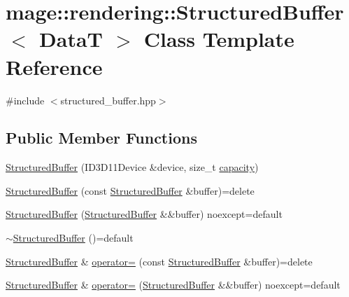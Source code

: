 \hypertarget{classmage_1_1rendering_1_1_structured_buffer}{}\section{mage\+:\+:rendering\+:\+:Structured\+Buffer$<$ DataT $>$ Class Template Reference}
\label{classmage_1_1rendering_1_1_structured_buffer}


{\ttfamily \#include $<$structured\+\_\+buffer.\+hpp$>$}

\subsection*{Public Member Functions}
\begin{DoxyCompactItemize}
\item 
\hyperlink{classmage_1_1rendering_1_1_structured_buffer_a7a12044b41fccd5c3a9c6d600ae8fd14}{Structured\+Buffer} (I\+D3\+D11\+Device \&device, size\+\_\+t \hyperlink{classmage_1_1rendering_1_1_structured_buffer_acbcdaebd04869e0248b8394c4823c433}{capacity})
\item 
\hyperlink{classmage_1_1rendering_1_1_structured_buffer_a447ca1bad6b4dc97bd993ce6e621f16a}{Structured\+Buffer} (const \hyperlink{classmage_1_1rendering_1_1_structured_buffer}{Structured\+Buffer} \&buffer)=delete
\item 
\hyperlink{classmage_1_1rendering_1_1_structured_buffer_ac6e1af93013761263b4ca418609b0518}{Structured\+Buffer} (\hyperlink{classmage_1_1rendering_1_1_structured_buffer}{Structured\+Buffer} \&\&buffer) noexcept=default
\item 
\hyperlink{classmage_1_1rendering_1_1_structured_buffer_a6c2ccb0efe7157e94f841981be71b6c7}{$\sim$\+Structured\+Buffer} ()=default
\item 
\hyperlink{classmage_1_1rendering_1_1_structured_buffer}{Structured\+Buffer} \& \hyperlink{classmage_1_1rendering_1_1_structured_buffer_a87a27778bf6097f84b63acc0eef49a3a}{operator=} (const \hyperlink{classmage_1_1rendering_1_1_structured_buffer}{Structured\+Buffer} \&buffer)=delete
\item 
\hyperlink{classmage_1_1rendering_1_1_structured_buffer}{Structured\+Buffer} \& \hyperlink{classmage_1_1rendering_1_1_structured_buffer_a488f44cb1e47689e5f7383ae8bdef823}{operator=} (\hyperlink{classmage_1_1rendering_1_1_structured_buffer}{Structured\+Buffer} \&\&buffer) noexcept=default
\item 

\end{DoxyCompactItemize}
